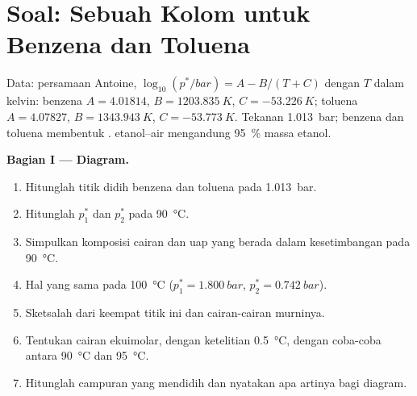 \section{Soal: Sebuah Kolom untuk Benzena dan Toluena}

\begin{problem}
\label{pb:b2:liquid-vapour-diagrams:1}
Data: persamaan Antoine, $\log_{10}(p^*/\unit{bar}) = A - B/(T + C)$ dengan
$T$ dalam kelvin: benzena $A = 4.01814$, $B = \qty{1203.835}{K}$, $C =
\qty{-53.226}{K}$; toluena $A = 4.07827$, $B = \qty{1343.943}{K}$, $C =
\qty{-53.773}{K}$. Tekanan \qty{1.013}{bar}; benzena dan toluena
membentuk .  etanol--air mengandung 95~\% massa
etanol.

\medskip
\noindent\textbf{Bagian I --- Diagram.}
\begin{enumerate}
  \item Hitunglah titik didih benzena dan toluena pada \qty{1.013}{bar}.
  \item Hitunglah $p_1^*$ dan $p_2^*$ pada \qty{90}{\degreeCelsius}.
  \item Simpulkan komposisi cairan dan uap yang berada dalam
        kesetimbangan pada \qty{90}{\degreeCelsius}.
  \item Hal yang sama pada \qty{100}{\degreeCelsius} ($p_1^* = \qty{1.800}{bar}$,
        $p_2^* =
        \qty{0.742}{bar}$).
  \item Sketsalah  dari keempat titik ini dan cairan-cairan
        murninya.
  \item Tentukan  cairan ekuimolar, dengan ketelitian
        \qty{0.5}{\degreeCelsius}, dengan coba-coba antara
        \qty{90}{\degreeCelsius} dan \qty{95}{\degreeCelsius}.
  \item Hitunglah  campuran yang mendidih dan nyatakan apa artinya
        bagi diagram.
\end{enumerate}


\end{problem}
